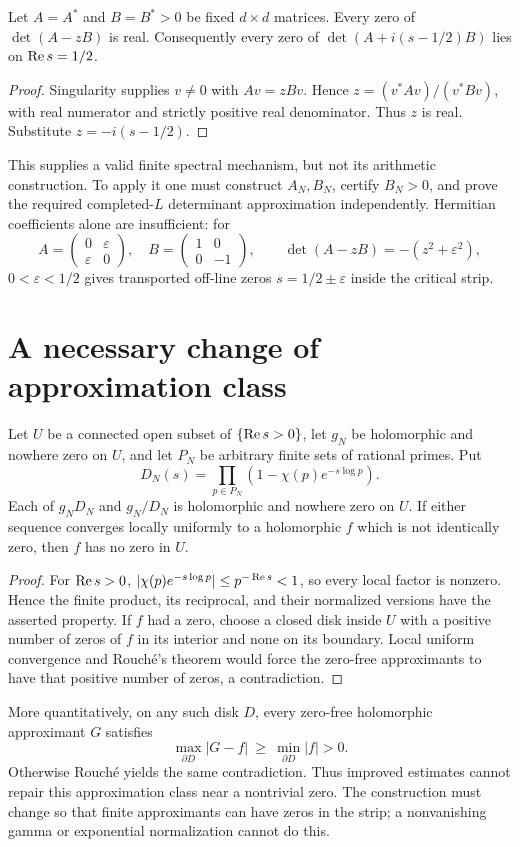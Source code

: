 \begin{proposition}\label{prop:positive-pencil}
Let $A=A^*$ and $B=B^*>0$ be fixed $d\times d$ matrices.
Every zero of $\det(A-zB)$ is real. Consequently every zero of
$\det(A+i(s-1/2)B)$ lies on $\operatorname{Re} s=1/2$.
\end{proposition}
\begin{proof}
Singularity supplies $v\ne0$ with $Av=zBv$. Hence
$z=(v^*Av)/(v^*Bv)$, with real numerator and strictly positive real
denominator. Thus $z$ is real. Substitute $z=-i(s-1/2)$.
\end{proof}
This supplies a valid finite spectral mechanism, but not its arithmetic
construction. To apply it one must construct $A_N,B_N$, certify
$B_N>0$, and prove the required completed-$L$ determinant approximation
independently. Hermitian coefficients alone are insufficient: for
\[
 A=\begin{pmatrix}0&\varepsilon\\\varepsilon&0\end{pmatrix},
 \quad B=\begin{pmatrix}1&0\\0&-1\end{pmatrix},\qquad
 \det(A-zB)=-(z^2+\varepsilon^2),
\]
$0<\varepsilon<1/2$ gives transported off-line zeros
$s=1/2\pm\varepsilon$ inside the critical strip.

\section{A necessary change of approximation class}
\begin{theorem}\label{thm:euler-nogo}
Let $U$ be a connected open subset of $\{\operatorname{Re} s>0\}$, let $g_N$
be holomorphic and nowhere zero on $U$, and let $P_N$ be arbitrary
finite sets of rational primes. Put
\[
 D_N(s)=\prod_{p\in P_N}(1-\chi(p)e^{-s\log p}).
\]
Each of $g_ND_N$ and $g_N/D_N$ is holomorphic and nowhere zero on $U$.
If either sequence converges locally uniformly to a holomorphic $f$
which is not identically zero, then $f$ has no zero in $U$.
\end{theorem}
\begin{proof}
For $\operatorname{Re} s>0$, $|\chi(p)e^{-s\log p}|\le p^{-\operatorname{Re} s}<1$,
so every local factor is nonzero. Hence the finite product, its reciprocal,
and their normalized versions have the asserted property.
If $f$ had a zero, choose a closed disk inside $U$ with a positive
number of zeros of $f$ in its interior and none on its boundary.
Local uniform convergence and Rouch\'e's theorem would force the
zero-free approximants to have that positive number of zeros, a contradiction.
\end{proof}
More quantitatively, on any such disk $D$, every zero-free holomorphic
approximant $G$ satisfies
\[
 \max_{\partial D}|G-f|\ \ge\ \min_{\partial D}|f|>0.
\]
Otherwise Rouch\'e yields the same contradiction. Thus improved estimates
cannot repair this approximation class near a nontrivial zero. The
construction must change so that finite approximants can have zeros in
the strip; a nonvanishing gamma or exponential normalization cannot do this.

